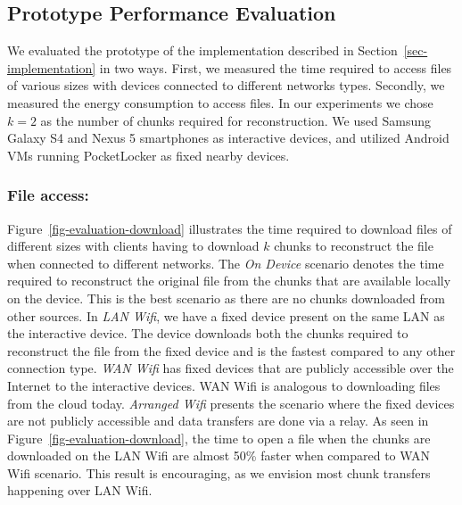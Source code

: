 \subsection{Prototype Performance Evaluation}
\label{subsec-performance-evaluation}

We evaluated the prototype of the implementation described in
Section~\ref{sec-implementation} in two ways. First, we measured the time
required to access files of various sizes with devices connected to different
networks types. Secondly, we measured the energy consumption to access files.
In our experiments we chose $k=2$ as the number of chunks required for
reconstruction. We used Samsung Galaxy S4 and Nexus 5 smartphones as
interactive devices, and utilized Android VMs running PocketLocker as fixed
nearby devices.

\subsubsection{File access:\space} \label{sec-fileaccess}
Figure~\ref{fig-evaluation-download} illustrates the time required to download
files of different sizes with clients having to download $k$ chunks to
reconstruct the file when connected to different networks. The \textit{On
Device} scenario denotes the time required to reconstruct the original file
from the chunks that are available locally on the device. This is the best
scenario as there are no chunks downloaded from other sources. In \textit{LAN
  Wifi}, we
have a fixed device present on the same LAN as the interactive device. The
device downloads both the chunks required to reconstruct the file from the fixed
device and is the fastest compared
to any other connection type. \textit{WAN Wifi} has fixed devices that are
publicly accessible over the Internet to the interactive devices. WAN Wifi is
analogous to downloading files from the cloud today. \textit{Arranged Wifi}
presents the scenario where the fixed devices are not publicly accessible and
data transfers are done via a relay. As seen in
Figure~\ref{fig-evaluation-download}, the time to open a file when the
chunks are downloaded on the LAN Wifi are almost 50\% faster when compared to
WAN Wifi scenario. This result is encouraging, as we envision most chunk
transfers happening over LAN Wifi.

